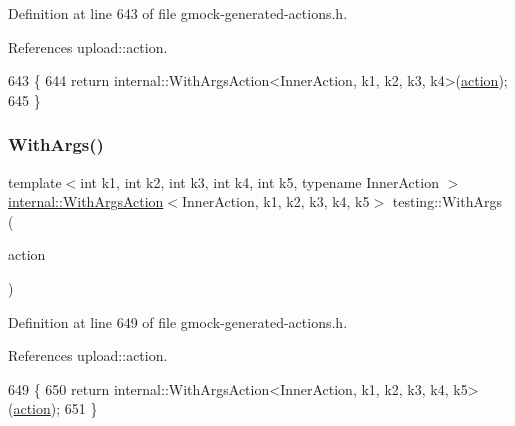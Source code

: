 Definition at line 643 of file gmock-\/generated-\/actions.\+h.



References upload\+::action.


\begin{DoxyCode}
643                                     \{
644   \textcolor{keywordflow}{return} internal::WithArgsAction<InnerAction, k1, k2, k3, k4>(\hyperlink{namespaceupload_a675d13c979f1c720866d22ed1736f580}{action});
645 \}
\end{DoxyCode}
\mbox{\label{namespacetesting_aa36b0c7216df96bdacf9fe491afd40bd}} 
\subsubsection{\texorpdfstring{With\+Args()}{WithArgs()}\hspace{0.1cm}{\footnotesize\ttfamily [5/10]}}
{\footnotesize\ttfamily template$<$int k1, int k2, int k3, int k4, int k5, typename Inner\+Action $>$ \\
\hyperlink{classtesting_1_1internal_1_1WithArgsAction}{internal\+::\+With\+Args\+Action}$<$Inner\+Action, k1, k2, k3, k4, k5$>$ testing\+::\+With\+Args (\begin{DoxyParamCaption}\item[{const Inner\+Action \&}]{action }\end{DoxyParamCaption})\hspace{0.3cm}{\ttfamily [inline]}}



Definition at line 649 of file gmock-\/generated-\/actions.\+h.



References upload\+::action.


\begin{DoxyCode}
649                                     \{
650   \textcolor{keywordflow}{return} internal::WithArgsAction<InnerAction, k1, k2, k3, k4, k5>(\hyperlink{namespaceupload_a675d13c979f1c720866d22ed1736f580}{action});
651 \}
\end{DoxyCode}
\mbox{\label{namespacetesting_a6df9cd27659e5943b5d3d77fc4f102e3}} 
